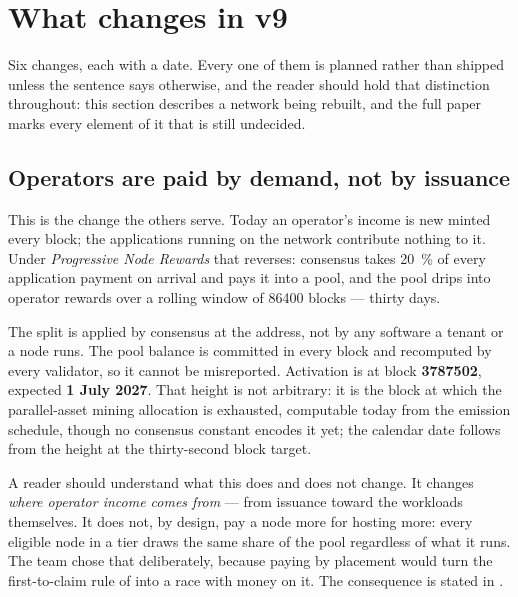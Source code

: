 \section{What changes in v9}
\label{sec:short:changes}

Six changes, each with a date. Every one of them is planned rather than shipped unless the sentence
says otherwise, and the reader should hold that distinction throughout: this section describes a
network being rebuilt, and the full paper marks every element of it that is still undecided.

\subsection{Operators are paid by demand, not by issuance}

This is the change the others serve. Today an operator's income is new \flux{} minted every block;
the applications running on the network contribute nothing to it. Under \emph{Progressive Node
Rewards} that reverses: consensus takes \SI{20}{\percent} of every application payment on arrival
and pays it into a pool, and the pool drips into operator rewards over a rolling window of
\num{86400} blocks --- thirty days. 

The split is applied by consensus at the address, not by any software a tenant or a node runs. The
pool balance is committed in every block and recomputed by every validator, so it cannot be
misreported. Activation is at block \textbf{\num{3787502}}, expected \textbf{1 July 2027}. That
height is not arbitrary: it is the block at which the parallel-asset mining allocation is exhausted,
computable today from the emission schedule, though no consensus constant encodes it yet; the
calendar date follows from the height at the thirty-second block target.

A reader should understand what this does and does not change. It changes \emph{where operator
income comes from} --- from issuance toward the workloads themselves. It does not, by design, pay a
node more for hosting more: every eligible node in a tier draws the same share of the pool
regardless of what it runs. The team chose that deliberately, because paying by placement would
turn the first-to-claim rule of  into a race with money on it. The consequence
is stated in .

